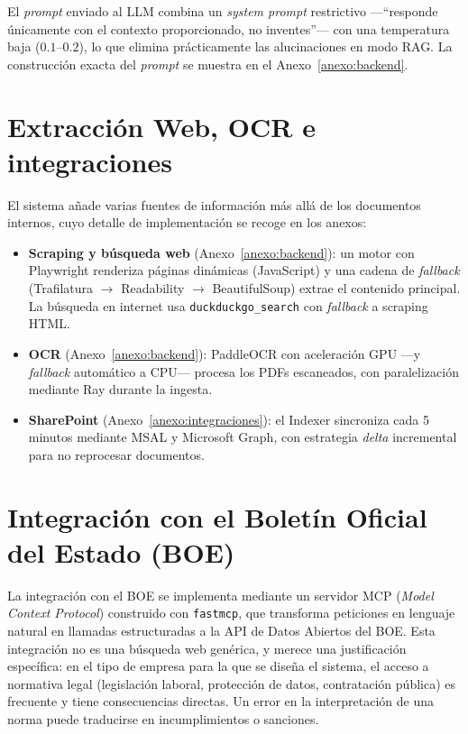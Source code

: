 El \textit{prompt} enviado al LLM combina un \textit{system prompt} restrictivo ---``responde únicamente con el contexto proporcionado, no inventes''--- con una temperatura baja ($0.1$--$0.2$), lo que elimina prácticamente las alucinaciones en modo RAG. La construcción exacta del \textit{prompt} se muestra en el Anexo~\ref{anexo:backend}.

\section{Extracción Web, OCR e integraciones}
\label{sec:extraccion-integraciones}

El sistema añade varias fuentes de información más allá de los documentos internos, cuyo detalle de implementación se recoge en los anexos:

\begin{itemize}
    \item \textbf{Scraping y búsqueda web} (Anexo~\ref{anexo:backend}): un motor con Playwright renderiza páginas dinámicas (JavaScript) y una cadena de \textit{fallback} (Trafilatura $\rightarrow$ Readability $\rightarrow$ BeautifulSoup) extrae el contenido principal. La búsqueda en internet usa \texttt{duckduckgo\_search} con \textit{fallback} a scraping HTML.
    \item \textbf{OCR} (Anexo~\ref{anexo:backend}): PaddleOCR con aceleración GPU ---y \textit{fallback} automático a CPU--- procesa los PDFs escaneados, con paralelización mediante Ray durante la ingesta.
    \item \textbf{SharePoint} (Anexo~\ref{anexo:integraciones}): el Indexer sincroniza cada 5 minutos mediante MSAL y Microsoft Graph, con estrategia \textit{delta} incremental para no reprocesar documentos.
\end{itemize}

\section{Integración con el Boletín Oficial del Estado (BOE)}
\label{sec:boe-impl}

La integración con el BOE se implementa mediante un servidor MCP (\textit{Model Context Protocol}) construido con \texttt{fastmcp}, que transforma peticiones en lenguaje natural en llamadas estructuradas a la API de Datos Abiertos del BOE. Esta integración no es una búsqueda web genérica, y merece una justificación específica: en el tipo de empresa para la que se diseña el sistema, el acceso a normativa legal (legislación laboral, protección de datos, contratación pública) es frecuente y tiene consecuencias directas. Un error en la interpretación de una norma puede traducirse en incumplimientos o sanciones.

